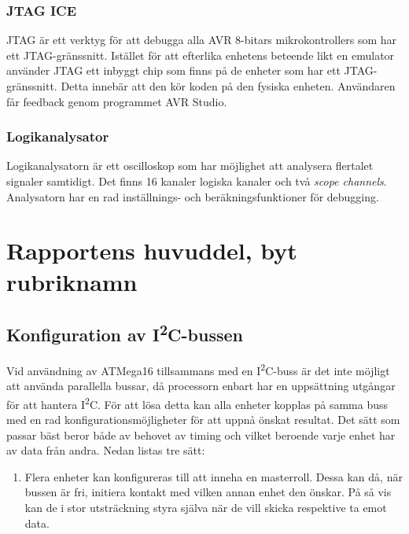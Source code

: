 \documentclass[11pt]{article}
\begin{document}
\begin{flushleft}
\subsubsection{JTAG ICE}

JTAG är ett verktyg för att debugga alla AVR 8-bitars mikrokontrollers som har ett JTAG-gränssnitt. Istället för att efterlika enhetens beteende likt en emulator använder JTAG ett inbyggt chip som finns på de enheter som har ett JTAG-gränssnitt. Detta innebär att den kör koden på den fysiska enheten. Användaren får feedback genom programmet AVR Studio. \cite{guideJTAG}

\subsubsection{Logikanalysator}

Logikanalysatorn är ett oscilloskop som har möjlighet att analysera flertalet signaler samtidigt. Det finns 16 kanaler logiska kanaler och  två \textit{scope channels}. Analysatorn har en rad inställnings- och beräkningsfunktioner för debugging. \cite{guideLogic}

\pagebreak

\section{Rapportens huvuddel, byt rubriknamn}

\subsection{Konfiguration av I\textsuperscript{2}C-bussen}

Vid användning av ATMega16 tillsammans med en I\textsuperscript{2}C-buss är det inte möjligt att använda parallella bussar, då processorn enbart har en uppsättning utgångar för att hantera I\textsuperscript{2}C. För att lösa detta kan alla enheter kopplas på samma buss med en rad konfigurationsmöjligheter för att uppnå önskat resultat. Det sätt som passar bäst beror både av behovet av timing och vilket beroende varje enhet har av data från andra. Nedan listas tre sätt:

\begin{enumerate}
 \item Flera enheter kan konfigureras till att inneha en masterroll. Dessa kan då, när bussen är fri, initiera kontakt med vilken annan enhet den önskar. På så vis kan de i stor utsträckning styra själva när de vill skicka respektive ta emot data.
 

\end{enumerate}
\end{flushleft}
\end{document}
